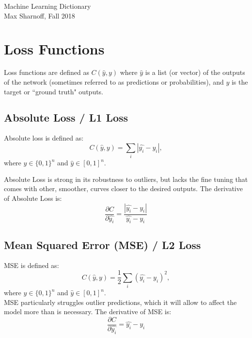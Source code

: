 \documentclass[fleqn]{article}
\begin{document}
\setlength\abovedisplayskip{3pt}
\setlength\belowdisplayskip{3pt}

\begingroup
	\centering
	\LARGE Machine Learning Dictionary\\[1.5em]
	\large Max Sharnoff, Fall 2018\par
\endgroup

\section{Loss Functions}

Loss functions are defined as $C(\hat{y}, y)$ where $\hat{y}$ is a list
(or vector) of the outputs of the network (sometimes referred to as
predictions or probabilities), and $y$ is the target or ``ground truth"
outputs.

\subsection{Absolute Loss / L1 Loss}
Absolute loss is defined as:
\[ C(\hat{y}, y) = {\sum}_i|\hat{y_i} - y_i|, \]
where $y \in \{0, 1\}^n$ and $\hat{y} \in [0, 1]^n$.

Absolute Loss is strong in its robustness to outliers, but lacks the
fine tuning that comes with other, smoother, curves closer to the desired
outputs.
The derivative of Absolute Loss is:
\[ \frac{\partial C}{\partial \hat{y_i}} =
	\frac{|\hat{y_i} - y_i|}{\hat{y_i} - y_i} \]

\subsection{Mean Squared Error (MSE) / L2 Loss}
MSE is defined as:
\[ C(\hat{y}, y) = \frac{1}{2} {\sum}_i(\hat{y_i} - y_i)^2, \]
where $y \in \{0, 1\}^n$ and $\hat{y} \in [0, 1]^n$.\\
MSE particularly struggles outlier predictions, which it will allow to
affect the model more than is necessary.
The derivative of MSE is:
\[ \frac{\partial C}{\partial \hat{y_i}} = \hat{y_i} - y_i \]
\end{document}
